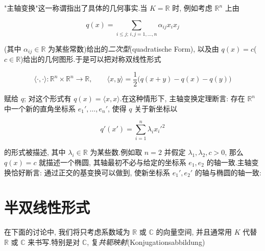 "主轴变换"这一称谓指出了具体的几何事实.当 $K = \mathbb{R}$ 时, 例如考虑 $\mathbb{R}^n$ 上由

\[
q(x) = \sum_{i \leq j;\, i, j = 1, \ldots, n} \alpha_{ij} x_i x_j
\]

(其中 $\alpha_{ij} \in \mathbb{R}$ 为某些常数)给出的\emph{二次型}(\textup{quadratische Form}), 以及由 $q(x) = c$($c \in \mathbb{R}$)给出的几何图形.于是可以把对称双线性形式

\[
\langle \cdot, \cdot \rangle \colon \mathbb{R}^n \times \mathbb{R}^n \longrightarrow \mathbb{R}, \qquad \langle x, y \rangle = \frac{1}{2}\bigl(q(x + y) - q(x) - q(y)\bigr)
\]

赋给 $q$; 对这个形式有 $q(x) = \langle x, x \rangle$.在这种情形下, 主轴变换定理断言: 存在 $\mathbb{R}^n$ 中一个新的直角坐标系 $e_1', \ldots, e_n'$, 使得 $q$ 关于新坐标以

\[
q'(x') = \sum_{i = 1}^{n} \lambda_i x_i'^2
\]

的形式被描述, 其中 $\lambda_i \in \mathbb{R}$ 为某些数.例如取 $n = 2$ 并假定 $\lambda_1, \lambda_2, c > 0$, 那么 $q(x) = c$ 就描述一个椭圆, 其轴最初不必与给定的坐标系 $e_1, e_2$ 的轴一致.主轴变换恰好断言: 通过正交的基变换可以做到, 使新坐标系 $e_1', e_2'$ 的轴与椭圆的轴一致:

\begin{center}
\end{center}

\section{半双线性形式}\label{sec:7.1}

在下面的讨论中, 我们将只考虑系数域为 $\mathbb{R}$ 或 $\mathbb{C}$ 的向量空间, 并且通常用 $K$ 代替 $\mathbb{R}$ 或 $\mathbb{C}$ 来书写.特别是对 $\mathbb{C}$, 复\emph{共轭映射}(\textup{Konjugationsabbildung})

